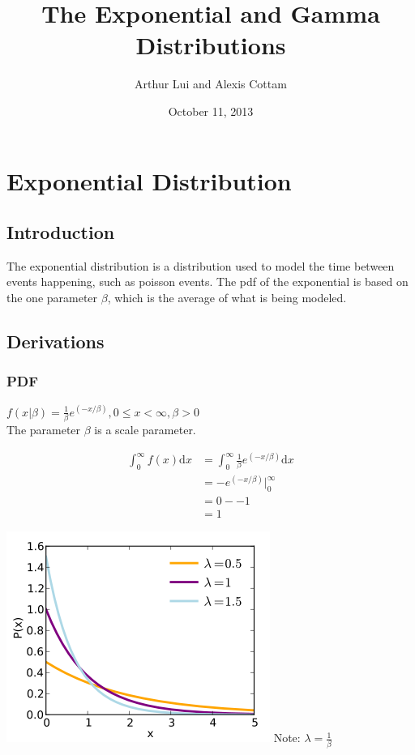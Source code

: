 \documentclass{article}
\begin{document}
\title{The Exponential and Gamma Distributions}
\author{Arthur Lui and Alexis Cottam}
\date{October 11, 2013}
\def\wl{\par \vspace{\baselineskip}}

\maketitle



\section*{Exponential Distribution}
\subsection*{Introduction}
The exponential distribution is a distribution used to model the time between events happening, such as poisson events.  The pdf of the exponential is based on the one parameter $\beta$, which is the average of what is being modeled.   


\subsection*{Derivations}

\subsubsection*{PDF}


$f(x \vert \beta) = \frac{1}{\beta}e^{(-x/\beta)},     0 \leq x < \infty,  \beta > 0$  \\
The parameter $\beta$ is a scale parameter.


\begin{align*}
\int_0^\infty f(x) \mathrm{d}x &=  \int_0^\infty \frac{1}{\beta}e^{(-x/\beta)} \mathrm{d}x 
\\ &= - e^{(-x/\beta)} \bigg\vert_0^\infty \\ &= 0 - -1 \\ &= 1
\end{align*}

\includegraphics[scale=.50]{exppdf.png}
Note: $\lambda = \frac{1}{\beta}$ 
\end{document}
